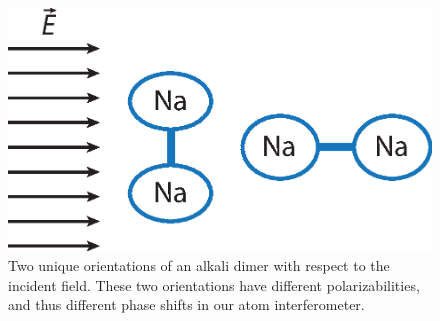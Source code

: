 \begin{figure}
\includegraphics[width=1\textwidth]{Figures/dimerPolarizability.eps}
\caption[Alkali dimers in an electric field.]{\label{dimerOrientationFig}Two unique orientations of an alkali dimer with respect to the incident field. These two orientations have different polarizabilities, and thus different phase shifts in our atom interferometer.}
\end{figure}










